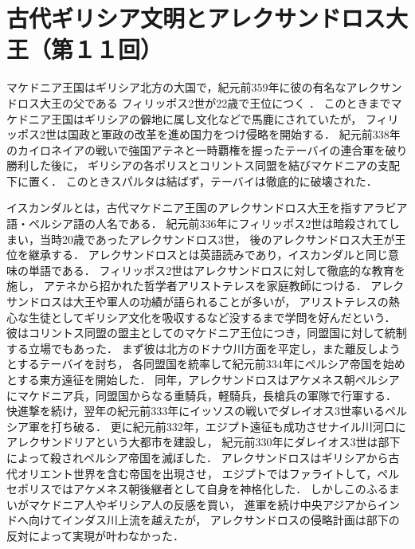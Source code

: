 \documentclass[10.5pt, aJ4]{jarticle}
\begin{document}
\section{古代ギリシア文明とアレクサンドロス大王（第１１回）}
\label{sec:org049c5c7}

マケドニア王国はギリシア北方の大国で，紀元前359年に彼の有名なアレクサンドロス大王の父である
フィリッポス2世が22歳で王位につく \cite{Alexandros+Y-History,Alexandros+Uraken} ．
このときまでマケドニア王国はギリシアの僻地に属し文化などで馬鹿にされていたが，
フィリッポス2世は国政と軍政の改革を進め国力をつけ侵略を開始する．
紀元前338年のカイロネイアの戦いで強国アテネと一時覇権を握ったテーバイの連合軍を破り勝利した後に，
ギリシアの各ポリスとコリントス同盟を結びマケドニアの支配下に置く．
このときスパルタは結ばず，テーバイは徹底的に破壊された．

イスカンダルとは，古代マケドニア王国のアレクサンドロス大王を指すアラビア語・ペルシア語の人名である．
紀元前336年にフィリッポス2世は暗殺されてしまい，当時20歳であったアレクサンドロス3世，
後のアレクサンドロス大王が王位を継承する．
アレクサンドロスとは英語読みであり，イスカンダルと同じ意味の単語である．
フィリッポス2世はアレクサンドロスに対して徹底的な教育を施し，
アテネから招かれた哲学者アリストテレスを家庭教師につける．
アレクサンドロスは大王や軍人の功績が語られることが多いが，
アリストテレスの熱心な生徒としてギリシア文化を吸収するなど没するまで学問を好んだという．
彼はコリントス同盟の盟主としてのマケドニア王位につき，同盟国に対して統制する立場でもあった．
まず彼は北方のドナウ川方面を平定し，また離反しようとするテーバイを討ち，
各同盟国を統率して紀元前334年にペルシア帝国を始めとする東方遠征を開始した．
同年，アレクサンドロスはアケメネス朝ペルシアにマケドニア兵，同盟国からなる重騎兵，軽騎兵，長槍兵の軍隊で行軍する．
快進撃を続け，翌年の紀元前333年にイッソスの戦いでダレイオス3世率いるペルシア軍を打ち破る．
更に紀元前332年，エジプト遠征も成功させナイル川河口にアレクサンドリアという大都市を建設し，
紀元前330年にダレイオス3世は部下によって殺されペルシア帝国を滅ぼした．
アレクサンドロスはギリシアから古代オリエント世界を含む帝国を出現させ，
エジプトではファライトして，ペルセポリスではアケメネス朝後継者として自身を神格化した．
しかしこのふるまいがマケドニア人やギリシア人の反感を買い，
進軍を続け中央アジアからインドへ向けてインダス川上流を越えたが，
アレクサンドロスの侵略計画は部下の反対によって実現が叶わなかった．




\end{document}

